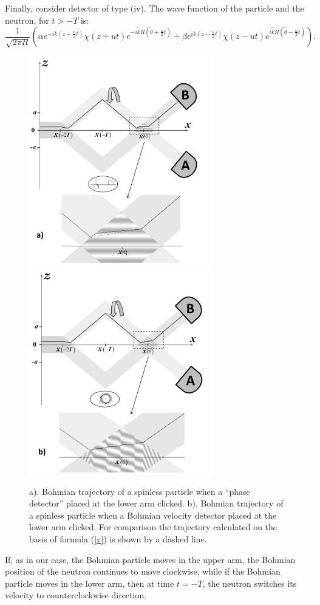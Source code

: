 \documentclass[12pt,preprint,tightenlines]{elsarticle}
\begin{document}
Finally, consider detector of type (iv). The wave function of the
particle and the neutron, for $t>-T$ is:
 \begin{equation}
\frac{1}{\sqrt{2\pi R}}\left(\alpha e^{-ik(z+\frac{u}{2}t)}\chi(z+ut)e^{-i\tilde{k}R(\tilde{\theta}+\frac{\omega}{2}t)}+\beta e^{ik(z-\frac{u}{2}t)}\chi(z-ut)e^{i\tilde{k}R(\tilde{\theta}-\frac{\omega}{2}t)}\right).\label{psioutnox4ns}
\end{equation}
\begin{figure}[H]\vspace{-10pt}
     \includegraphics[width=8cm]{9a.pdf}\\\vspace{-5pt}
         \includegraphics[width=8cm]{9b.pdf}\\\vspace{-10pt}
    \caption{a). Bohmian  trajectory of a spinless particle when a ``phase detector'' placed at the lower arm clicked.
   b). Bohmian  trajectory of a spinless particle when a Bohmian velocity  detector placed at the lower arm clicked.
   For comparison the  trajectory calculated on the basis of formula (\ref{v}) is shown by a dashed line.}
\end{figure}
If,  as in our case, the Bohmian particle moves in the upper arm,
the Bohmian position of the neutron continues to move clockwise, while
if the Bohmian particle moves in the lower arm, then at time $t=-T$, the
neutron switches its velocity to counterclockwise direction.
\end{document}
